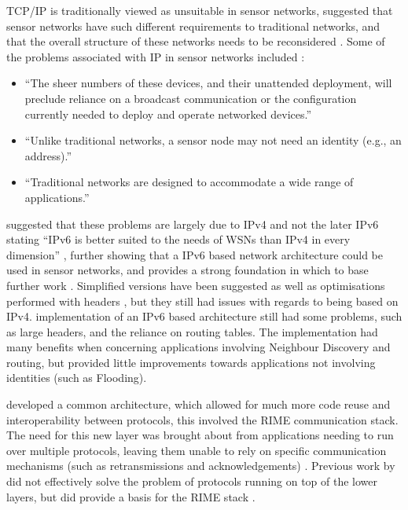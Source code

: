 TCP/IP is traditionally viewed as unsuitable in sensor networks, \citeauthor{Estrin:1999:NCC:313451.313556} suggested that sensor networks have such different requirements to traditional networks, and that the overall structure of these networks needs to be reconsidered \cite{Estrin:1999:NCC:313451.313556}. Some of the problems \citeauthor{Estrin:1999:NCC:313451.313556} associated with IP in sensor networks included \cite{Estrin:1999:NCC:313451.313556}:
\begin{itemize}
	\item ``The sheer numbers of these devices, and their unattended deployment, will preclude reliance on a broadcast communication or the conﬁguration currently needed to deploy and operate networked devices.''
	\item ``Unlike traditional networks, a sensor node may not need an identity (e.g., an address).''
	\item ``Traditional networks are designed to accommodate a wide range of applications.''
\end{itemize}
\citeauthor{Hui:2008:IDL:1460412.1460415} suggested that these problems are largely due to IPv4 and not the later IPv6 stating ``IPv6 is better suited to the needs of WSNs than IPv4 in every dimension'' \cite{Hui:2008:IDL:1460412.1460415}, further showing that a IPv6 based network architecture could be used in sensor networks, and provides a strong foundation in which to base further work \cite{Durvy:2008:MSN:1460412.1460483}. Simplified versions have been suggested as well as optimisations performed with headers \cite{Dunkels:2003:FTA:1066116.1066118,Dunkels04makingtcp/ip}, but they still had issues with regards to being based on IPv4.  \citeauthor{Estrin:1999:NCC:313451.313556} implementation of an IPv6 based architecture still had some problems, such as large headers, and the reliance on routing tables. The implementation had many benefits when concerning applications involving Neighbour Discovery and routing, but provided little improvements towards applications not involving identities (such as Flooding).

\citeauthor{Dunkels:2007:ACA:1322263.1322295} developed a common architecture, which allowed for much more code reuse and interoperability between protocols, this involved the RIME communication stack. The need for this new layer was brought about from applications needing to run over multiple protocols, leaving them unable to rely on specific communication mechanisms (such as retransmissions and acknowledgements) \cite{Dunkels:2007:ACA:1322263.1322295}. Previous work by \citeauthor{Ee:2006:MNL:1298455.1298479,Polastre:2005:ULA:1098918.1098928} \cite{Ee:2006:MNL:1298455.1298479,Polastre:2005:ULA:1098918.1098928} did not effectively solve the problem of protocols running on top of the lower layers, but did provide a basis for the RIME stack \cite{Dunkels:2007:ACA:1322263.1322295}. 

